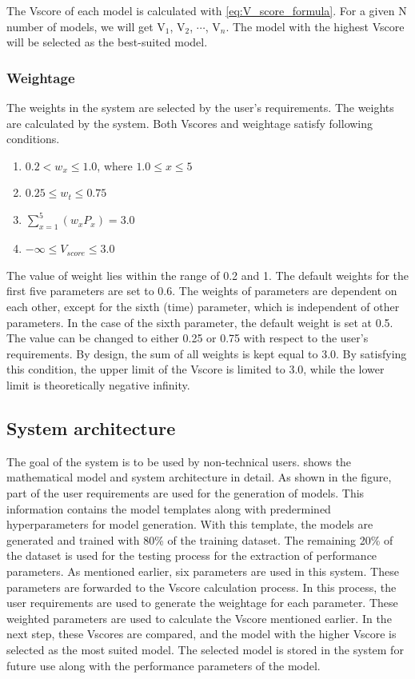 \documentclass[a4paper,fleqn]{cas-dc}
\begin{document}
The Vscore of each model is calculated with \cref{eq:V_score_formula}. For a given N number of models, we will get V$_1$, V$_2$, $\cdots$, V$_n$. The model with the highest Vscore will be selected as the best-suited model.

\subsubsection{Weightage}\label{subsubsec:weightage}

The weights in the system are selected by the user's requirements. The weights are calculated by the system.
Both Vscores and weightage satisfy following conditions.
\vspace{-0.5em}
\begin{enumerate}
    \item $0.2 < w_x \le 1.0$, where $1.0 \le x \le 5$
    \item $0.25 \le w_t \le 0.75$
    \item $\sum_{x=1}^5(w_xP_x) = 3.0$
    \item $-\infty \le V_{score} \le 3.0$
\end{enumerate}

The value of weight lies within the range of 0.2 and 1. The default weights for the first five parameters are set to 0.6. The weights of parameters are dependent on each other, except for the sixth (time) parameter, which is independent of other parameters. In the case of the sixth parameter, the default weight is set at 0.5. The value can be changed to either 0.25 or 0.75 with respect to the user's requirements. By design, the sum of all weights is kept equal to 3.0. By satisfying this condition, the upper limit of the Vscore is limited to 3.0, while the lower limit is theoretically negative infinity.

\subsection{System architecture}\label{subsec:system_architecture}

The goal of the system is to be used by non-technical users.  shows the mathematical model and system architecture in detail. As shown in the figure, part of the user requirements are used for the generation of models. This information contains the model templates along with predermined hyperparameters for model generation. With this template, the models are generated and trained with 80\% of the training dataset. The remaining 20\% of the dataset is used for the testing process for the extraction of performance parameters. As mentioned earlier, six parameters are used in this system. These parameters are forwarded to the Vscore calculation process. In this process, the user requirements are used to generate the weightage for each parameter. These weighted parameters are used to calculate the Vscore mentioned earlier. In the next step, these Vscores are compared, and the model with the higher Vscore is selected as the most suited model. The selected model is stored in the system for future use along with the performance parameters of the model.
\end{document}
